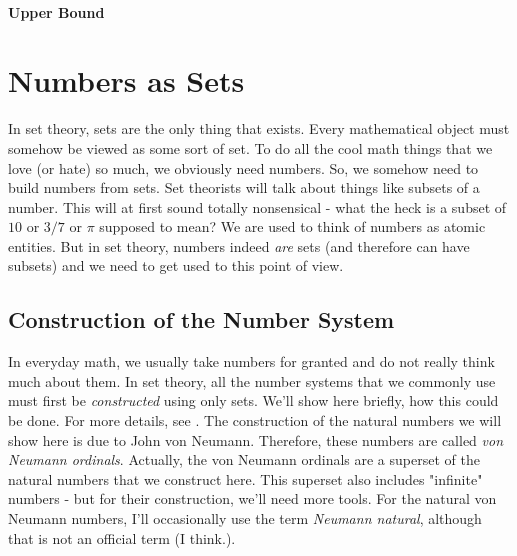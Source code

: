 

\paragraph{Upper Bound}




\section{Numbers as Sets}
In set theory, sets are the only thing that exists. Every mathematical object must somehow be viewed as some sort of set. To do all the cool math things that we love (or hate) so much, we obviously need numbers. So, we somehow need to build numbers from sets. Set theorists will talk about things like subsets of a number. This will at first sound totally nonsensical - what the heck is a subset of $10$ or $3/7$ or $\pi$ supposed to mean? We are used to think of numbers as atomic entities. But in set theory, numbers indeed \emph{are} sets (and therefore can have subsets) and we need to get used to this point of view.

% 




\subsection{Construction of the Number System}
In everyday math, we usually take numbers for granted and do not really think much about them. In set theory, all the number systems that we commonly use must first be \emph{constructed} using only sets. We'll show here briefly, how this could be done. For more details, see \cite{PDF_MathFAQ}. The construction of the natural numbers we will show here is due to John von Neumann. Therefore, these numbers are called \emph{von Neumann ordinals}. Actually, the von Neumann ordinals are a superset of the natural numbers that we construct here. This superset also includes "infinite" numbers - but for their construction, we'll need more tools. For the natural von Neumann numbers, I'll occasionally use the term \emph{Neumann natural}, although that is not an official term (I think.).

